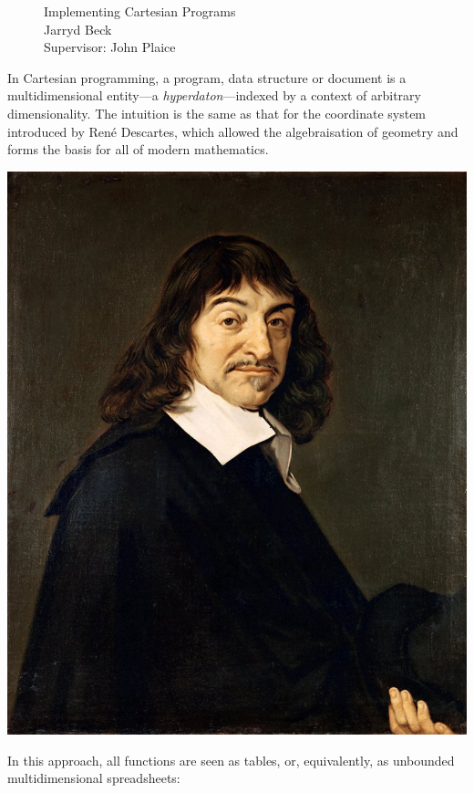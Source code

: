\documentclass[a4paper]{article}
\begin{document}
\begin{figure}[t]
\begin{centering}
\Huge
Implementing Cartesian Programs\\
Jarryd Beck\\
Supervisor: John Plaice\\
\end{centering}
\end{figure}

\begin{multicols}{2}
\noindent
In Cartesian programming, a program, data structure or document is a
multidimensional entity---a \emph{hyperdaton}---indexed by a context of
arbitrary dimensionality.  The intuition is the same as that for the
coordinate system introduced by René Descartes, which allowed the
algebraisation of geometry and forms the basis for all of modern mathematics.    
\begin{center}
\includegraphics[scale=0.15]{Descartes.pdf}
\end{center}

\noindent
In this approach, all functions are seen as tables,
or, equivalently, as unbounded multidimensional
spreadsheets:


\end{multicols}
\end{document}
